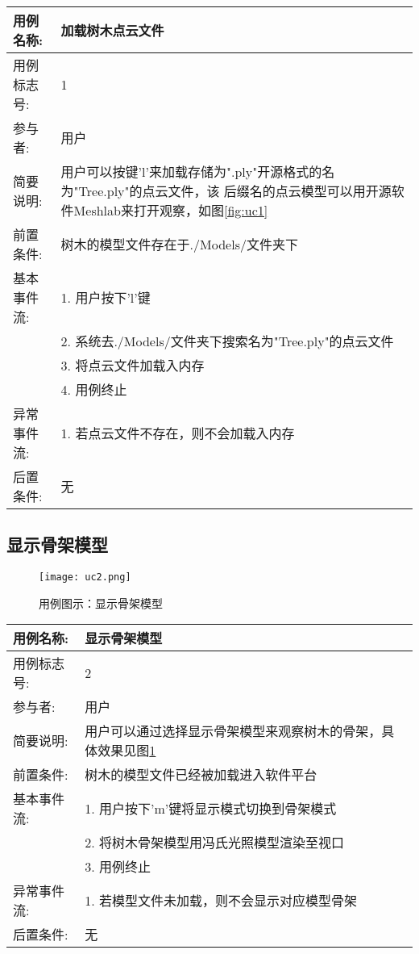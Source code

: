 \begin{table}[H]
	\centering
\begin{tabular}{|l|p{8cm}|}
	\hline
	用例名称: & 加载树木点云文件\\
	\hline
	用例标志号: & 1\\
	\hline
	参与者: & 用户\\
	\hline
	简要说明: & 用户可以按键'l'来加载存储为".ply"开源格式的名为"Tree.ply"的点云文件，该
	后缀名的点云模型可以用开源软件Meshlab来打开观察，如图\ref{fig:uc1}\\
	\hline
	前置条件: & 树木的模型文件存在于./Models/文件夹下\\
	\hline
	基本事件流: & 1. 用户按下'l'键\\
	 & 2. 系统去./Models/文件夹下搜索名为"Tree.ply"的点云文件\\
	 & 3. 将点云文件加载入内存\\
	 & 4. 用例终止\\
	\hline
	异常事件流: & 1. 若点云文件不存在，则不会加载入内存\\
	\hline
	后置条件: & 无\\
	\hline
\end{tabular}
\end{table}

\clearpage
\subsection{显示骨架模型}
\begin{figure}[H]
	\centering
	\texttt{[image: uc2.png]}
	\caption{用例图示：显示骨架模型}
	\label{fig:uc2}
\end{figure}

\begin{table}[H]
	\centering
\begin{tabular}{|l|p{8cm}|}
	\hline
	用例名称: & 显示骨架模型\\
	\hline
	用例标志号: & 2\\
	\hline
	参与者: & 用户\\
	\hline
	简要说明: & 用户可以通过选择显示骨架模型来观察树木的骨架，具体效果见图\ref{fig:uc2}\\
	\hline
	前置条件: & 树木的模型文件已经被加载进入软件平台\\
	\hline
	基本事件流: & 1. 用户按下'm'键将显示模式切换到骨架模式\\
	 & 2. 将树木骨架模型用冯氏光照模型渲染至视口\\
	 & 3. 用例终止\\
	\hline
	异常事件流: & 1. 若模型文件未加载，则不会显示对应模型骨架\\
	\hline
	后置条件: & 无\\
	\hline
\end{tabular}
\end{table}

